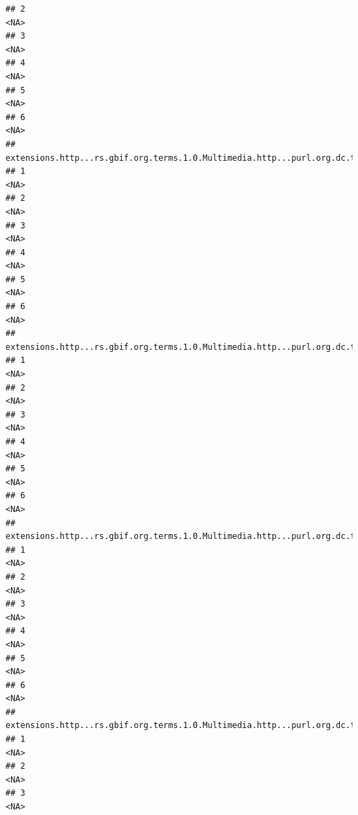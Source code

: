 \documentclass[
]{book}
\begin{document}
\begin{verbatim}
## 2                                                                                  <NA>
## 3                                                                                  <NA>
## 4                                                                                  <NA>
## 5                                                                                  <NA>
## 6                                                                                  <NA>
##   extensions.http...rs.gbif.org.terms.1.0.Multimedia.http...purl.org.dc.terms.license
## 1                                                                                <NA>
## 2                                                                                <NA>
## 3                                                                                <NA>
## 4                                                                                <NA>
## 5                                                                                <NA>
## 6                                                                                <NA>
##   extensions.http...rs.gbif.org.terms.1.0.Multimedia.http...purl.org.dc.terms.created
## 1                                                                                <NA>
## 2                                                                                <NA>
## 3                                                                                <NA>
## 4                                                                                <NA>
## 5                                                                                <NA>
## 6                                                                                <NA>
##   extensions.http...rs.gbif.org.terms.1.0.Multimedia.http...purl.org.dc.terms.format
## 1                                                                               <NA>
## 2                                                                               <NA>
## 3                                                                               <NA>
## 4                                                                               <NA>
## 5                                                                               <NA>
## 6                                                                               <NA>
##   extensions.http...rs.gbif.org.terms.1.0.Multimedia.http...purl.org.dc.terms.references
## 1                                                                                   <NA>
## 2                                                                                   <NA>
## 3                                                                                   <NA>

\end{verbatim}
\end{document}
